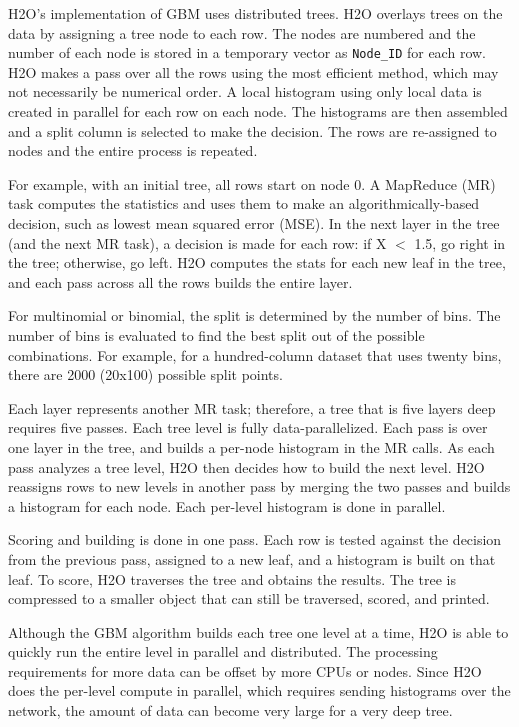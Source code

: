 H2O's implementation of GBM uses distributed trees. H2O overlays trees on the data by assigning a tree node to each row.
The nodes are numbered and the number of each node is stored in a temporary vector as {\texttt{Node\_ID}} for each row. H2O makes a pass over all the rows using the most efficient method, which may not necessarily be  numerical order. A local
histogram using only local data is created in parallel for each row on each node. The histograms are then assembled and a split column is selected to make the decision. The rows are re-assigned to nodes and the entire process is repeated.

For example, with an initial tree, all rows start on node 0. A MapReduce (MR) task computes the statistics and uses
them to make an algorithmically-based decision, such as lowest mean squared error (MSE). In the next layer in the
tree (and the next MR task), a decision is made for each row: if X $<$ 1.5, go right in the tree; otherwise, go left.
H2O computes the stats for each new leaf in the tree, and each pass across all the rows builds the entire layer.

For multinomial or binomial, the split is determined by the number of bins. The number of bins is evaluated to
find the best split out of the possible combinations. For example, for a hundred-column dataset that uses twenty bins,
there are 2000 (20x100) possible split points.

Each layer represents another MR task; therefore, a tree that is five layers deep requires five passes. Each tree
level is fully data-parallelized. Each pass is over one layer in the tree, and builds a per-node histogram in the
MR calls. As each pass analyzes a tree level, H2O then decides how to build the next level. H2O reassigns rows to
new levels in another pass by merging the two passes and builds a histogram for each node. Each per-level histogram
is done in parallel.

Scoring and building is done in one pass. Each row is tested against the decision from the previous pass, assigned
to a new leaf, and a histogram is built on that leaf. To score, H2O traverses the tree and obtains the results. The
tree is compressed to a smaller object that can still be traversed, scored, and printed.

Although the GBM algorithm builds each tree one level at a time, H2O is able to quickly run the entire level in
parallel and distributed. The processing requirements for more data can be offset by more CPUs or nodes.
Since H2O does the per-level compute in parallel, which requires sending histograms over the network, the amount
of data can become very large for a very deep tree.


